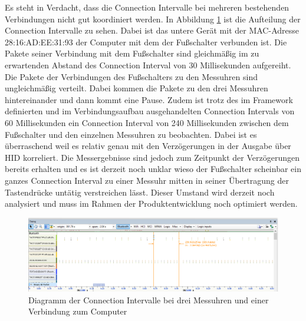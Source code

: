 Es steht in Verdacht, dass die Connection Intervalle bei mehreren bestehenden Verbindungen nicht gut koordiniert werden. In Abbildung \ref{fig:DiagrammConnectionIntervalle} ist die Aufteilung der Connection Intervalle zu sehen. Dabei ist das untere Gerät mit der MAC-Adresse 28:16:AD:EE:31:93 der Computer mit dem der Fußschalter verbunden ist. Die Pakete seiner Verbindung mit dem Fußschalter sind gleichmäßig im zu erwartenden Abstand des Connection Interval von 30 Millisekunden aufgereiht. Die Pakete der Verbindungen des Fußschalters zu den Messuhren sind ungleichmäßig verteilt. Dabei kommen die Pakete zu den drei Messuhren hintereinander und dann kommt eine Pause. Zudem ist trotz des im Framework definierten und im Verbindungsaufbau ausgehandelten Connection Intervals von 60 Millisekunden ein Connection Interval von 240 Millisekunden zwischen dem Fußschalter und den einzelnen Messuhren zu beobachten. Dabei ist es überraschend weil es relativ genau mit den Verzögerungen in der Ausgabe über HID korreliert. Die Messergebnisse sind jedoch zum Zeitpunkt der Verzögerungen bereits erhalten und es ist derzeit noch unklar wieso der Fußschalter scheinbar ein ganzes Connection Interval zu einer Messuhr mitten in seiner Übertragung der Tastendrücke untätig verstreichen lässt. Dieser Umstand wird derzeit noch analysiert und muss im Rahmen der Produktentwicklung noch optimiert werden.
\begin{figure}[H] 
	\centering
	\includegraphics[width=\textwidth]{figures/ConnectionIntervalle.png}
	\caption{Diagramm der Connection Intervalle bei drei Messuhren und einer Verbindung zum Computer}
	\label{fig:DiagrammConnectionIntervalle}
\end{figure}


